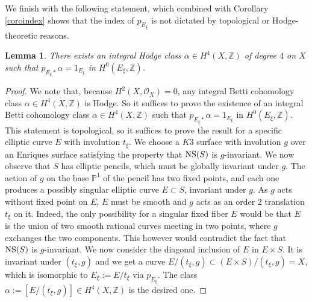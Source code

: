 \documentclass[10pt]{article}
\newtheorem{lemm}[theo]{Lemma}
\begin{document}
We finish with the following statement, which combined with Corollary \ref{coroindex} shows that the index of $p_{E_\xi}$ is not dictated by topological or Hodge-theoretic reasons.
\begin{lemm}\label{lehodgeindex} There exists an integral Hodge class $\alpha\in H^4(X,\mathbb{Z})$ of degree $4$ on $X$ such that
$p_{E_\xi*}\alpha=1_{E_\xi}$ in $H^0(E_\xi,\mathbb{Z})$.
\end{lemm}
\begin{proof} We note that, because $H^2(X,\mathcal{O}_X)=0$, any integral Betti cohomology class $\alpha\in H^4(X,\mathbb{Z})$ is Hodge. So it suffices to prove the existence of an integral Betti cohomology class $\alpha\in H^4(X,\mathbb{Z})$ such that $p_{E_\xi*}\alpha=1_{E_\xi}$ in $H^0(E_\xi,\mathbb{Z})$. This statement is topological, so it suffices to prove the result for a specific elliptic curve $E$ with involution $t_\xi$. We choose a $K3$ surface with involution $g$ over an Enriques surface satisfying the property that ${\rm NS}(S)$ is $g$-invariant. We now observe that $S$  has elliptic pencils, which must be   globally invariant under $g$. The action of $g$ on the base $\mathbb{P}^1$ of the pencil has two fixed points, and each one produces a possibly singular elliptic curve $E\subset S$, invariant under $g$. As $g$ acts without fixed  point on $E$, $E$ must be smooth and $g$ acts as an order $2$  translation  $t_\xi$ on it. Indeed, the only possibility for a singular fixed fiber $E$ would be that $E$ is the union of two smooth rational curves meeting in two points, where $g$ exchanges the two components. This however would contradict the fact that ${\rm NS}(S)$ is $g$-invariant. We now consider the diagonal inclusion of $E$ in $E\times S$. It is invariant under $(t_\xi, g)$ and we get a curve $E/ (t_\xi, g)\subset (E\times S)/(t_\xi,g)=X$, which is isomorphic to $E_\xi:=E/t_\xi$ via $p_{E_\xi}$. The class $\alpha:=[E/ (t_\xi, g)]\in H^4(X,\mathbb{Z})$ is the desired one.
\end{proof}
\end{document}
